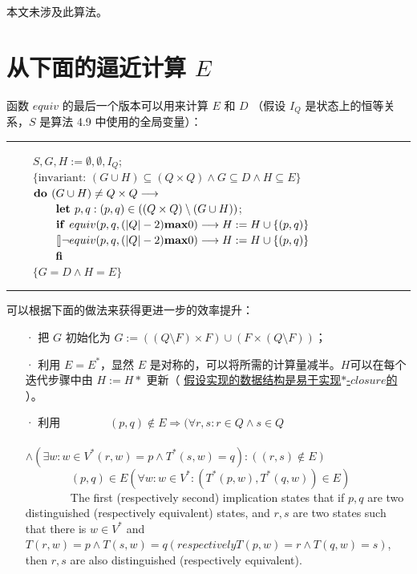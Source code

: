 本文未涉及此算法。


\section{从下面的逼近计算 $E$ }

函数 $equiv$ 的最后一个版本可以用来计算 $E$ 和 $D$ （假设 $I_Q $ 是状态上的恒等关系，$S$ 是算法 4.9 中使用的全局变量）：
\newline
{}
\\
\rule{\textwidth}{1pt}
\mbox{　　} $ S,G,H := \emptyset,\emptyset,I_Q$; \\
\mbox{　　} $ \{ \mbox{invariant: } (G \cup H ) \subseteq (Q \times Q) \land G \subseteq D \land H \subseteq E \} $ \\
\mbox{　　} $ \mbox{\textbf{do }} (G \cup H) \not= Q \times Q \longrightarrow  $ \\
\mbox{　　　　} $ \mbox{\textbf{let }} p,q : (p,q) \in ( ( Q\times Q) \setminus ( G \cup H) )  $; \\
\mbox{　　　　} $ \mbox{\textbf{if }} equiv ( p,q, (|Q|-2) \mbox{\textbf{max}} 0  ) \longrightarrow H:=H \cup \{ (p,q) \} $ \\
\mbox{　　　　} $ \talloblong \neg equiv ( p,q, (|Q|-2) \mbox{\textbf{max}} 0  ) \longrightarrow H:=H \cup \{ (p,q) \} $ \\
\mbox{　　　　} $ \mbox{\textbf{fi}}$ \\
\mbox{　　} $ \{ G=D \land H = E \} $ \\
\rule{\textwidth}{1pt}
可以根据下面的做法来获得更进一步的效率提升：
\begin{itemize}
    \item [·] 把 $G$ 初始化为 $ G := ( (Q\setminus F) \times F ) \cup ( F \times ( Q \setminus F ) ) $；
    \item [·] 利用 $E=E^*$，显然 $E$ 是对称的，可以将所需的计算量减半。$H$可以在每个迭代步骤中由 $H := H*$ 更新（ \underline{假设实现的数据结构是易于实现$*$-$closure$的} ）。
    \item [·] 利用 
    \newline
    \mbox{　　　　}$ (p,q) \notin E  \Rightarrow ( \forall r,s:r\in Q \land s \in Q $\\
    \mbox{　　　　　　　　}$\land (\exists w:w\in V^* (r,w) = p \land T^* (s,w) = q): ((r,s) \not\in E )$ \\
    \mbox{　　　　}$ (p,q) \in E (\forall w:w\in V^* : (T^*(p,w),T^*(q,w))\in E)$ \\
    \mbox{　　　　}The first (respectively second) implication states that if $p,q$ are two distinguished (respectively equivalent) states, and $r,s$ are two states such that there is $w \in V^*  $ and $ T(r,w) = p \land T(s,w) = q (respectively T(p,w) = r \land T (q,w) = s ) $, then $r,s$ are also distinguished (respectively equivalent).
\end{itemize}

